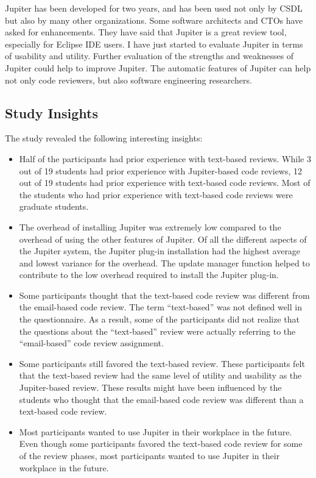 Jupiter has been developed for two years, and has been used not only by CSDL but also by many other organizations. Some software architects and CTOs have asked for enhancements. They have said that Jupiter is a great review tool, especially for Eclipse IDE users. I have just started to evaluate Jupiter in terms of usability and utility. Further evaluation of the strengths and weaknesses of Jupiter could help to improve Jupiter. The automatic features of Jupiter can help not only code reviewers, but also software engineering researchers.

\subsection{Study Insights}
\label{subsec:study-insights}

The study revealed the following interesting insights:

\begin{itemize}
	\item Half of the participants had prior experience with text-based reviews. While 3 out of 19 students had prior experience with Jupiter-based code reviews, 12 out of 19 students had prior experience with text-based code reviews. Most of the students who had prior experience with text-based code reviews were graduate students.
	\item The overhead of installing Jupiter was extremely low compared to the overhead of using the other features of Jupiter. Of all the different aspects of the Jupiter system, the Jupiter plug-in installation had the highest average and lowest variance for the overhead. The update manager function helped to contribute to the low overhead required to install the Jupiter plug-in.
	\item Some participants thought that the text-based code review was different from the email-based code review. The term ``text-based'' was not defined well in the questionnaire. As a result, some of the participants did not realize that the questions about the ``text-based'' review were actually referring to the ``email-based'' code review assignment.
	\item Some participants still favored the text-based review. These participants felt that the text-based review had the same level of utility and usability as the Jupiter-based review. These results might have been influenced by the students who thought that the email-based code review was different than a text-based code review.
	\item Most participants wanted to use Jupiter in their workplace in the future. Even though some participants favored the text-based code review for some of the review phases, most participants wanted to use Jupiter in their workplace in the future.
\end{itemize}

